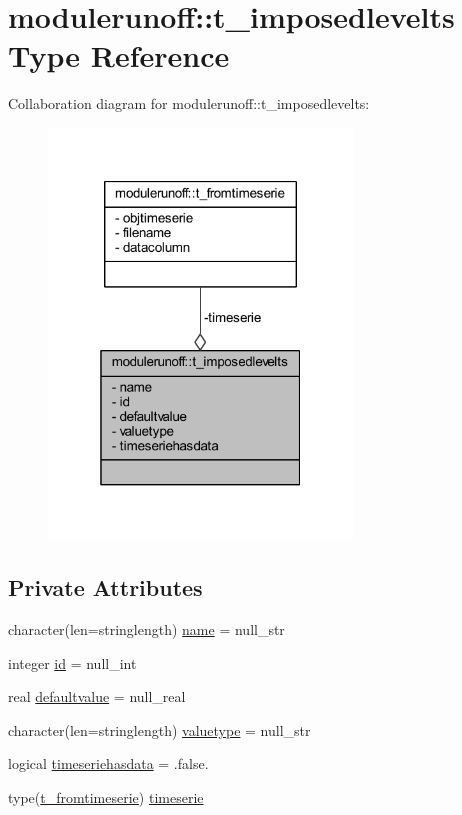 \hypertarget{structmodulerunoff_1_1t__imposedlevelts}{}\section{modulerunoff\+:\+:t\+\_\+imposedlevelts Type Reference}
\label{structmodulerunoff_1_1t__imposedlevelts}


Collaboration diagram for modulerunoff\+:\+:t\+\_\+imposedlevelts\+:\nopagebreak
\begin{figure}[H]
\begin{center}
\leavevmode
\includegraphics[width=229pt]{structmodulerunoff_1_1t__imposedlevelts__coll__graph}
\end{center}
\end{figure}
\subsection*{Private Attributes}
\begin{DoxyCompactItemize}
\item 
character(len=stringlength) \mbox{\hyperlink{structmodulerunoff_1_1t__imposedlevelts_adc3528f687b2dd956413c701cf3fb1a2}{name}} = null\+\_\+str
\item 
integer \mbox{\hyperlink{structmodulerunoff_1_1t__imposedlevelts_a2bb7f4026b8abff6a89bc9083295e7c4}{id}} = null\+\_\+int
\item 
real \mbox{\hyperlink{structmodulerunoff_1_1t__imposedlevelts_a465c140b95625dfac38b1bb2da808936}{defaultvalue}} = null\+\_\+real
\item 
character(len=stringlength) \mbox{\hyperlink{structmodulerunoff_1_1t__imposedlevelts_ae7d1637de38ffbb2ee14a7a4b9b6009e}{valuetype}} = null\+\_\+str
\item 
logical \mbox{\hyperlink{structmodulerunoff_1_1t__imposedlevelts_a693b8ec3e27b613b72fdaa3332b3ff5b}{timeseriehasdata}} = .false.
\item 
type(\mbox{\hyperlink{structmodulerunoff_1_1t__fromtimeserie}{t\+\_\+fromtimeserie}}) \mbox{\hyperlink{structmodulerunoff_1_1t__imposedlevelts_a19abb53951527ff418f5aba8f0897c60}{timeserie}}
\end{DoxyCompactItemize}


